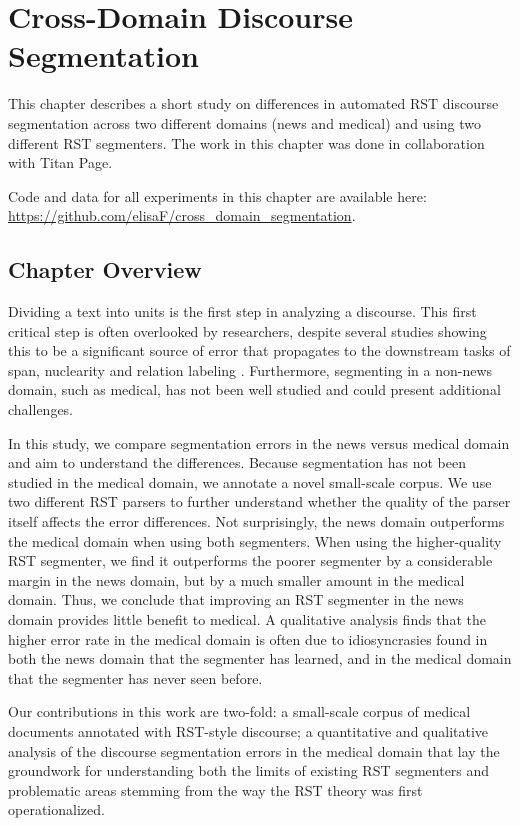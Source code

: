 \chapter{Cross-Domain Discourse Segmentation}\label{ch:rstseg}

This chapter describes a short study on differences in automated RST discourse segmentation across two different domains (news and medical) and using two different RST segmenters. The work
in this chapter was done in collaboration with Titan Page.

Code and data for all experiments in this chapter are available here: \url{https://github.com/elisaF/cross_domain_segmentation}.

\section{Chapter Overview}

Dividing a text into units is the first step in analyzing a discourse. This first critical step is often overlooked by researchers, despite several studies showing this to be a significant source of error that propagates to the downstream tasks of span, nuclearity and relation labeling \cite{Feng:2015}. Furthermore, segmenting in a non-news domain, such as medical, has not been well studied and could present additional challenges.

In this study, we compare segmentation errors in the news versus medical domain and aim to understand the differences. Because segmentation has not been studied in the medical domain, we annotate a novel small-scale corpus. We use two different RST parsers to further understand whether the quality of the parser itself affects the error differences. Not surprisingly, the news domain outperforms the medical domain when using both segmenters. When using the higher-quality RST segmenter, we find it outperforms the poorer segmenter by a considerable margin in the news domain, but by a much smaller amount in the medical domain. Thus, we conclude that improving an RST segmenter in the news domain provides little benefit to medical. A qualitative analysis finds that the higher error rate in the medical domain is often due to idiosyncrasies found in both the news domain that the segmenter has learned, and in the medical domain that the segmenter has never seen before.

Our contributions in this work are two-fold: a small-scale corpus of medical documents annotated with RST-style discourse; a quantitative and qualitative analysis of the discourse segmentation errors in the medical domain that lay the groundwork for understanding both the limits of existing RST segmenters and problematic areas stemming from the way the RST theory was first operationalized.

